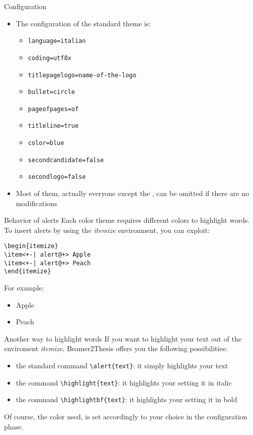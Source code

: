 \documentclass{beamer}
\begin{document}
\begin{frame}[t,fragile]{Configuration}
\begin{itemize}
\item The configuration of the standard theme is:
\begin{itemize}
\item \verb!language=italian!
\item \verb!coding=utf8x!
\item \verb!titlepagelogo=name-of-the-logo!
\item \verb!bullet=circle!
\item \verb!pageofpages=of!
\item \verb!titleline=true!
\item \verb!color=blue!
\item \verb!secondcandidate=false!
\item \verb!secondlogo=false!
\end{itemize}
\item Most of them, actually everyone except the , can be omitted if there are no modifications
\end{itemize}
\end{frame}

\begin{frame}[fragile]{Behavior of alerts}
Each color theme requires different colors to highlight words. To insert alerts by using the \emph{itemize} environment, you can exploit:
\begin{verbatim}
\begin{itemize}
\item<+-| alert@+> Apple
\item<+-| alert@+> Peach
\end{itemize}
\end{verbatim}
For example:
\begin{itemize}
\item<+-| alert@+> Apple
\item<+-| alert@+> Peach
\end{itemize}
\end{frame}

\begin{frame}[fragile]{Another way to highlight words}
If you want to highlight your text out of the enviroment \emph{itemize}, Beamer2Thesis offers you the following possibilities:
\begin{itemize}
\item the standard command \verb!\alert{text}!: it simply highlights your \alert{text}
\item the command \verb!\highlight{text}!: it highlights your  setting it in italic
\item the command \verb!\highlightbf{text}!: it highlights your  setting it in bold
\end{itemize}
Of course, the color used, is set accordingly to your choice in the configuration phase.
\end{frame}
\end{document}
